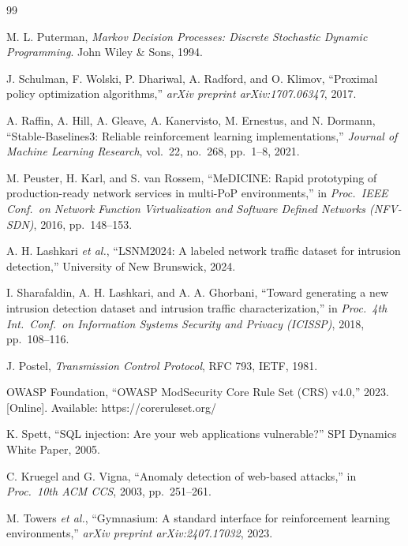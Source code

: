 \documentclass[12pt,a4paper]{report}
\begin{document}
\begin{thebibliography}{99}

M. L. Puterman, \textit{Markov Decision Processes: Discrete Stochastic Dynamic Programming}. John Wiley \& Sons, 1994.

J. Schulman, F. Wolski, P. Dhariwal, A. Radford, and O. Klimov, ``Proximal policy optimization algorithms,'' \textit{arXiv preprint arXiv:1707.06347}, 2017.

A. Raffin, A. Hill, A. Gleave, A. Kanervisto, M. Ernestus, and N. Dormann, ``Stable-Baselines3: Reliable reinforcement learning implementations,'' \textit{Journal of Machine Learning Research}, vol.\ 22, no.\ 268, pp.\ 1--8, 2021.

M. Peuster, H. Karl, and S. van Rossem, ``MeDICINE: Rapid prototyping of production-ready network services in multi-PoP environments,'' in \textit{Proc.\ IEEE Conf.\ on Network Function Virtualization and Software Defined Networks (NFV-SDN)}, 2016, pp.\ 148--153.

A. H. Lashkari \textit{et al.}, ``LSNM2024: A labeled network traffic dataset for intrusion detection,'' University of New Brunswick, 2024.

I. Sharafaldin, A. H. Lashkari, and A. A. Ghorbani, ``Toward generating a new intrusion detection dataset and intrusion traffic characterization,'' in \textit{Proc.\ 4th Int.\ Conf.\ on Information Systems Security and Privacy (ICISSP)}, 2018, pp.\ 108--116.

J. Postel, \textit{Transmission Control Protocol}, RFC 793, IETF, 1981.

OWASP Foundation, ``OWASP ModSecurity Core Rule Set (CRS) v4.0,'' 2023. [Online]. Available: https://coreruleset.org/

K. Spett, ``SQL injection: Are your web applications vulnerable?'' SPI Dynamics White Paper, 2005.

C. Kruegel and G. Vigna, ``Anomaly detection of web-based attacks,'' in \textit{Proc.\ 10th ACM CCS}, 2003, pp.\ 251--261.

M. Towers \textit{et al.}, ``Gymnasium: A standard interface for reinforcement learning environments,'' \textit{arXiv preprint arXiv:2407.17032}, 2023.


\end{thebibliography}
\end{document}
